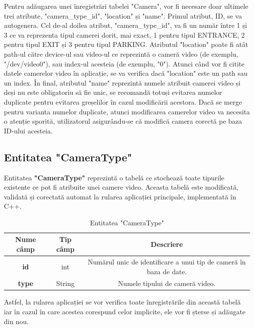 \documentclass[12pt]{article}
\begin{document}
Pentru ad\u{a}ugarea unei \^{i}nregistr\u{a}ri tabelei "Camera", vor fi necesare doar ultimele trei atribute, "camera\_type\_id", "location" și "name". Primul atribut, ID, se va autogenera. Cel de-al doilea atribut, "camera\_type\_id", va fi un num\u{a}r \^{i}ntre 1 și 3 ce va reprezenta tipul camerei dorit, mai exact, 1 pentru tipul ENTRANCE, 2 pentru tipul EXIT și 3 pentru tipul PARKING. Atributul "location" poate fi at\^{a}t path-ul c\u{a}tre device-ul sau video-ul ce reprezint\u{a} o camer\u{a} video (de exemplu, "/dev/video0"), sau index-ul acesteia (de exemplu, "0"). Atunci c\^{a}nd vor fi citite datele camerelor video \^{i}n aplicație, se va verifica dac\u{a} "location" este un path sau un index. \^{I}n final, atributul "name" reprezint\u{a} numele atribuit camerei video și deși nu este obligatoriu s\u{a} fie unic, se recomand\u{a} totuși evitarea numelor duplicate pentru evitarea greșelilor \^{i}n cazul modific\u{a}rii acestora. Dac\u{a} se merge pentru varianta numelor duplicate, atunci modificarea camerelor video va necesita o atenție sporit\u{a}, utilizatorul asigur\^{a}ndu-se c\u{a} modific\u{a} camera corect\u{a} pe baza ID-ului acesteia. 

\subsection{Entitatea "CameraType"}

Entitatea \textbf{"CameraType"} reprezint\u{a} o tabel\u{a} ce stocheaz\u{a} toate tipurile existente ce pot fi atribuite unei camere video. Aceasta tabel\u{a} este modificat\u{a}, validat\u{a} și corectat\u{a} automat la rularea aplicației principale, implementat\u{a} \^{i}n C++. 

\begin{table}[h]
\centering
\begin{tabular}{|c|c|c|}
\hline
\textbf{Nume c\^{a}mp}  & \textbf{Tip c\^{a}mp} & \textbf{Descriere} \\
\hline
\textbf{id} & int & Num\u{a}rul unic de identificare a unui tip de camer\u{a} \^{i}n baza de date.  \\
\hline
\textbf{type} & String & Numele tipului de camer\u{a} video.  \\
\hline
\end{tabular}
\caption{Entitatea "CameraType"}
\end{table}

Astfel, la rularea aplicației se vor verifica toate \^{i}nregistr\u{a}rile din aceast\u{a} tabel\u{a} iar \^{i}n cazul \^{i}n care acestea corespund celor implicite, ele vor fi șterse și ad\u{a}ugate din nou. 
\end{document}
